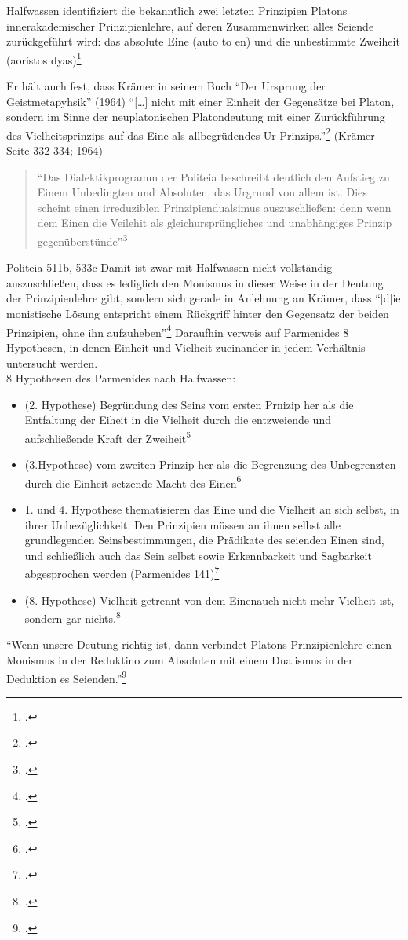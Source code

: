 \documentclass[12pt]{article}
\newcommand*{\zitatblock}[1]{%
    \begin{quote}
    \fontsize{10}{12}\selectfont
    \setlength{\parskip}{1.0em}
    #1
    \end{quote}
}
\begin{document}
Halfwassen identifiziert die bekanntlich zwei letzten Prinzipien Platons innerakademischer Prinzipienlehre, auf deren Zusammenwirken alles Seiende zurückgeführt wird: das absolute Eine (auto to en) und die unbestimmte Zweiheit (aoristos dyas)\footcite[vgl.][S. 67]{HalfwassenMonismusDualismus}

Er hält auch fest, dass Krämer in seinem Buch \enquote{Der Ursprung der Geistmetapyhsik} (1964) \enquote{[\dots] nicht mit einer Einheit der Gegensätze bei Platon, sondern im Sinne der neuplatonischen Platondeutung mit einer Zurückführung des Vielheitsprinzips auf das Eine als allbegrüdendes Ur-Prinzips.}\footcite[][S. 68]{HalfwassenMonismusDualismus} (Krämer Seite 332-334; 1964) 
\zitatblock{\enquote{Das Dialektikprogramm der Politeia beschreibt deutlich den Aufstieg zu Einem Unbedingten und Absoluten, das Urgrund von allem ist. Dies scheint einen irreduziblen Prinzipiendualsimus auszuschließen: denn wenn dem Einen die Veilehit als gleichursprüngliches und unabhängiges Prinzip gegenüberstünde}\footcite[][S. 70f.]{HalfwassenMonismusDualismus}} Politeia 511b, 533c
Damit ist zwar mit Halfwassen nicht vollständig auszuschließen, dass es lediglich den Monismus in dieser Weise in der Deutung der Prinzipienlehre gibt, sondern sich gerade in Anlehnung an Krämer, dass \enquote{[d]ie monistische Lösung entspricht einem Rückgriff hinter den Gegensatz der beiden Prinzipien, ohne ihn aufzuheben}\footcite[vgl.][S. 333]{Krämer1964Geistmetaphysik}
Daraufhin verweis auf Parmenides 8 Hypothesen, in denen Einheit und Vielheit zueinander in jedem Verhältnis untersucht werden.\\
8 Hypothesen des Parmenides nach Halfwassen:
\begin{itemize}
    \item {(2. Hypothese) Begründung des Seins vom ersten Prnizip her als die Entfaltung der Eiheit in die Vielheit durch die entzweiende und aufschließende Kraft der Zweiheit}\footcite[vgl.][S. 72]{HalfwassenMonismusDualismus}
    \item {(3.Hypothese) vom zweiten Prinzip her als die Begrenzung des Unbegrenzten durch die Einheit-setzende Macht des Einen}\footcite[vgl.][S. 72]{HalfwassenMonismusDualismus}
    \item {1. und 4. Hypothese thematisieren das Eine und die Vielheit an sich selbst, in ihrer Unbezüglichkeit. Den Prinzipien müssen an ihnen selbst alle grundlegenden Seinsbestimmungen, die Prädikate des seienden Einen sind, und schließlich auch das Sein selbst sowie Erkennbarkeit und Sagbarkeit abgesprochen werden (Parmenides 141)}\footcite[vgl.][S. 72]{HalfwassenMonismusDualismus}
    \item {(8. Hypothese) Vielheit getrennt von dem Einenauch nicht mehr Vielheit ist, sondern gar nichts.\footcite[vgl.][S. 73]{HalfwassenMonismusDualismus}}
\end{itemize}
\enquote{Wenn unsere Deutung richtig ist, dann verbindet Platons Prinzipienlehre einen Monismus in der Reduktino zum Absoluten mit einem Dualismus in der Deduktion es Seienden.}\footcite[][S. 79]{HalfwassenMonismusDualismus}
\end{document}
